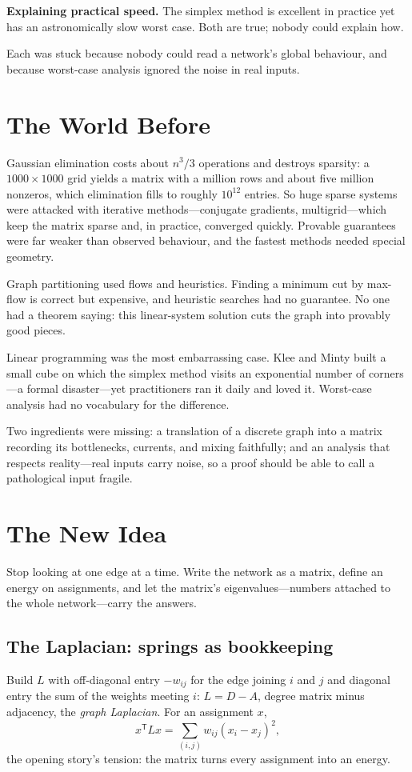 \noindent\textbf{Explaining practical speed.} The simplex method is excellent in practice yet has an astronomically slow worst case. Both are true; nobody could explain how.

Each was stuck because nobody could read a network's global behaviour, and because worst-case analysis ignored the noise in real inputs.

\section{The World Before}

Gaussian elimination costs about $n^3/3$ operations and destroys sparsity: a $1000\times1000$ grid yields a matrix with a million rows and about five million nonzeros, which elimination fills to roughly $10^{12}$ entries. So huge sparse systems were attacked with iterative methods---conjugate gradients, multigrid---which keep the matrix sparse and, in practice, converged quickly. Provable guarantees were far weaker than observed behaviour, and the fastest methods needed special geometry.

Graph partitioning used flows and heuristics. Finding a minimum cut by max-flow is correct but expensive, and heuristic searches had no guarantee. No one had a theorem saying: this linear-system solution cuts the graph into provably good pieces.

Linear programming was the most embarrassing case. Klee and Minty built a small cube on which the simplex method visits an exponential number of corners---a formal disaster---yet practitioners ran it daily and loved it. Worst-case analysis had no vocabulary for the difference.

Two ingredients were missing: a translation of a discrete graph into a matrix recording its bottlenecks, currents, and mixing faithfully; and an analysis that respects reality---real inputs carry noise, so a proof should be able to call a pathological input fragile.

\section{The New Idea}
Stop looking at one edge at a time. Write the network as a matrix, define an energy on assignments, and let the matrix's eigenvalues---numbers attached to the whole network---carry the answers.

\subsection{The Laplacian: springs as bookkeeping}
Build $L$ with off-diagonal entry $-w_{ij}$ for the edge joining $i$ and $j$ and diagonal entry the sum of the weights meeting $i$: $L=D-A$, degree matrix minus adjacency, the \emph{graph Laplacian}. For an assignment $x$,
\[
x^{\mathsf T}Lx=\sum_{(i,j)}w_{ij}(x_i-x_j)^2,
\]
the opening story's tension: the matrix turns every assignment into an energy.

